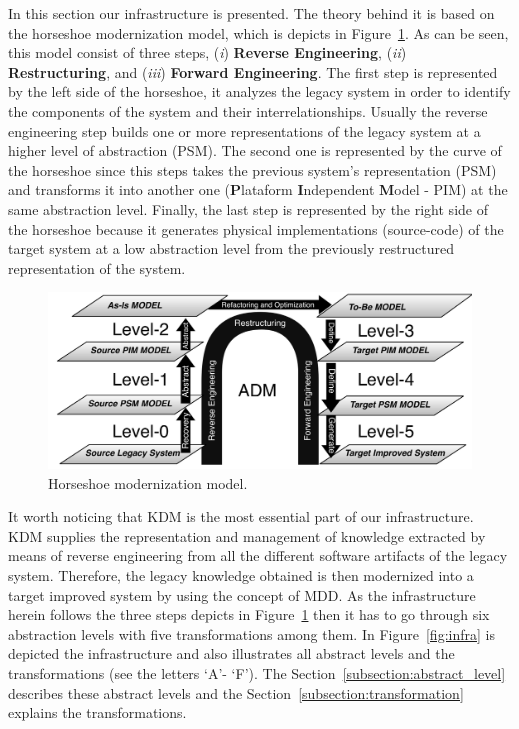 In this section our infrastructure is presented. The theory behind it is based on the horseshoe modernization model, which is depicts in Figure~\ref{fig:horseshoe}. As can be seen, this model consist of three steps, (\textit{i}) \textbf{Reverse Engineering}, (\textit{ii}) \textbf{Restructuring}, and (\textit{iii}) \textbf{Forward Engineering}. The first step is represented by the left side of the horseshoe, it analyzes the legacy system in order to identify the components of the system and their interrelationships. Usually the reverse engineering step builds one or more representations of the legacy system at a higher level of abstraction (PSM). The second one is represented by the curve of the horseshoe since this steps takes the previous system's representation (PSM) and transforms it into another one (\textbf{P}lataform \textbf{I}ndependent \textbf{M}odel - PIM) at the same abstraction level. Finally, the last step is represented by the right side of the horseshoe because it generates physical implementations (source-code) of the target system at a low abstraction level from the previously restructured representation of the system.

\begin{figure}[!h]
\centering
  \includegraphics[scale=0.6]{Figuras/horseShoeBOM}
\caption{Horseshoe modernization model.}
\label{fig:horseshoe}
\end{figure}

It worth noticing that KDM is the most essential part of our infrastructure. KDM supplies the representation and management of knowledge extracted by means of reverse engineering from all the different software artifacts of the legacy system. Therefore, the legacy knowledge obtained is then modernized into a target improved system by using the concept of MDD. As the infrastructure herein follows the three steps depicts in Figure~\ref{fig:horseshoe} then it has to go through six abstraction levels with five transformations among them. In Figure~\ref{fig:infra} is depicted the infrastructure and also illustrates all abstract levels and the transformations (see the letters `A'- `F'). The Section~\ref{subsection:abstract_level} describes these abstract levels and the Section~\ref{subsection:transformation} explains the transformations.

